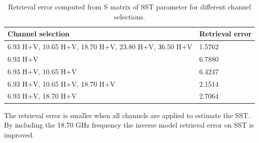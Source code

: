 \documentclass[11pt, a4paper]{article}
\begin{document}
\begin{table}[h!]
	\centering
	\begin{tabular}{@{}p{11cm}p{3cm}@{}}
		Channel selection & Retrieval error 
		\tabularnewline
		\midrule
		6.93 H+V, 10.65 H+V, 18.70 H+V, 23.80 H+V, 36.50 H+V & 1.5762	\\
		6.93 H+V	& 6.7880	\\
		6.93 H+V, 10.65 H+V	& 6.4247	\\
		6.93 H+V, 10.65 H+V, 18.70 H+V	& 2.1514		\\
		6.93 H+V, 18.70 H+V	& 2.7064	\\
		\midrule
	\end{tabular}
	\caption{Retrieval error computed from S matrix of SST parameter for different channel selections.}
	\label{tab:task3b_2}
\end{table}

The retrieval error is smaller when all channels are applied to estimate the SST. By including the 18.70 GHz frequency the inverse model retrieval error on SST is improved.
\end{document}
